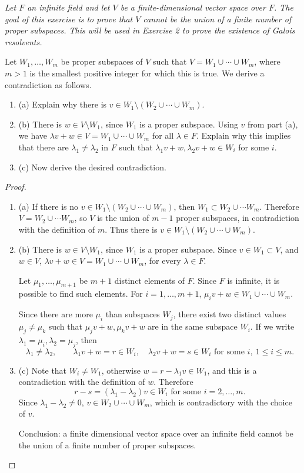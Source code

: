 \documentclass[11pt,a4paper]{article}
\newcommand{\be} {\begin{enumerate}}
\newcommand{\ee} {\end{enumerate}}
\begin{document}
{\it Let $F$ an infinite field and let $V$ be a finite-dimensional vector space over $F$. The goal of this exercise is to prove that $V$ cannot be the union of a finite number of proper subspaces. This will be used in Exercise 2 to prove the existence of Galois resolvents.

Let $W_1,\ldots,W_m$ be proper subspaces of $V$ such that $V = W_1\cup\cdots \cup W_m$, where $m>1$ is the smallest positive integer for which this is true. We derive a contradiction as follows.
\be
\item[(a)] Explain why there is $v \in W_1 \setminus (W_2\cup \cdots \cup W_m)$.
\item[(b)] There is $w \in V\setminus W_1$, since $W_1$ is a proper subspace. Using $v$ from part (a), we have $\lambda v + w \in V = W_1\cup \cdots \cup W_m$ for all $\lambda \in F$. Explain why this implies that there are $\lambda_1 \ne \lambda_2$ in $F$ such that $\lambda_1 v + w, \lambda_2 v + w \in W_i$ for some $i$.
\item[(c)] Now derive the desired contradiction.
\ee
}

\begin{proof}
\be
\item[(a)] If there is no $v \in W_1 \setminus (W_2\cup \cdots \cup W_m)$, then $W_1 \subset W_2\cup \cdots W_m$. Therefore $V = W_2\cup\cdots W_m$, so $V$ is the union of $m-1$ proper subspaces, in contradiction with the definition of $m$. Thus there is $v \in W_1 \setminus (W_2\cup \cdots \cup W_m)$.

\item[(b)] There is $w \in V\setminus W_1$, since $W_1$ is a proper subspace. Since $v \in W_1\subset V$, and $w \in V$, $\lambda v + w \in V = W_1\cup\cdots \cup W_m$, for every $\lambda \in F$.

Let $\mu_1,\ldots,\mu_{m+1}$ be $m+1$ distinct elements of $F$. Since $F$ is infinite, it is possible to find such elements. For $i=1,\ldots,m+1$, $\mu_i v + w \in W_1\cup\cdots \cup W_m$. 

Since there are more $\mu_i$ than subspaces $W_j$, there exist two distinct values $\mu_j \ne \mu_k$ such that $\mu_j v + w, \mu_k v + w$ are in the same subspace $W_i$. If we write $\lambda_1 = \mu_i, \lambda_2 = \mu_j$, then
$$\lambda_1 \ne \lambda_2, \qquad \lambda_1 v + w  = r  \in W_i, \quad  \lambda_2 v + w = s \in W_i \text{ for some } i, \ 1\leq i \leq m.$$

\item[(c)] Note that $W_i \ne W_1$, otherwise $ w = r -\lambda_1 v \in W_1$, and this is a contradiction with the definition of $w$. Therefore
$$r-s = (\lambda_1 - \lambda_2) v \in W_i \text{ for some } i=2,\ldots,m. $$
Since $\lambda_1 - \lambda_2 \ne 0$, $v \in W_2\cup \cdots \cup W_m$, which is contradictory with the choice of $v$.

Conclusion: a finite dimensional vector space over an infinite field cannot be the union of a finite number of proper subspaces.
\ee
\end{proof}
\end{document}
